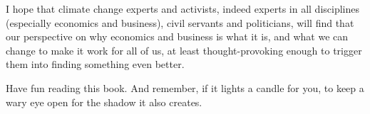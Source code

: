 I hope that climate change experts and activists, indeed experts in all disciplines (especially economics and business), civil servants and politicians, will find that our perspective on why economics and business is what it is, and what we can change to make it work for all of us, at least thought-provoking enough to trigger them into finding something even better.


Have fun reading this book. And remember, if it lights a candle for you, to keep a wary eye open for the shadow it also creates.

